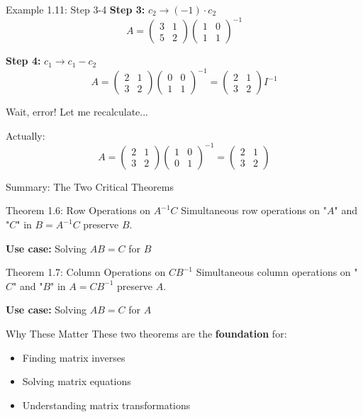 \documentclass[10pt]{beamer}
\theoremstyle{definition}
\newcommand{\x}[1]{\alert{\textbf{#1}}}
\begin{document}
\begin{frame}{Example 1.11: Step 3-4}
\textbf{Step 3:} $c_2 \to (-1) \cdot c_2$
$$A = \begin{pmatrix} 3 & 1 \\ 5 & 2 \end{pmatrix} \begin{pmatrix} 1 & 0 \\ 1 & 1 \end{pmatrix}^{-1}$$

\textbf{Step 4:} $c_1 \to c_1 - c_2$
$$A = \begin{pmatrix} 2 & 1 \\ 3 & 2 \end{pmatrix} \begin{pmatrix} 0 & 0 \\ 1 & 1 \end{pmatrix}^{-1} = \begin{pmatrix} 2 & 1 \\ 3 & 2 \end{pmatrix} I^{-1}$$

Wait, error! Let me recalculate...

Actually:
$$A = \begin{pmatrix} 2 & 1 \\ 3 & 2 \end{pmatrix} \begin{pmatrix} 1 & 0 \\ 0 & 1 \end{pmatrix}^{-1} = \begin{pmatrix} 2 & 1 \\ 3 & 2 \end{pmatrix}$$
\end{frame}

\begin{frame}{Summary: The Two Critical Theorems}
\begin{block}{Theorem 1.6: Row Operations on $A^{-1}C$}
Simultaneous row operations on "$A$" and "$C$" in $B = A^{-1}C$ preserve $B$.

\textbf{Use case:} Solving $AB = C$ for $B$
\end{block}

\vspace{0.3cm}
\begin{block}{Theorem 1.7: Column Operations on $CB^{-1}$}
Simultaneous column operations on "$C$" and "$B$" in $A = CB^{-1}$ preserve $A$.

\textbf{Use case:} Solving $AB = C$ for $A$
\end{block}

\vspace{0.5cm}
\begin{alertblock}{Why These Matter}
These two theorems are the \x{foundation} for:
\begin{itemize}
\item Finding matrix inverses
\item Solving matrix equations
\item Understanding matrix transformations
\end{itemize}
\end{alertblock}
\end{frame}
\end{document}
